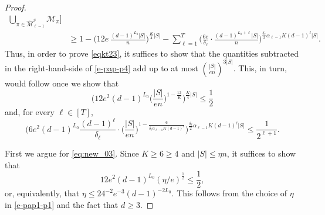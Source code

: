 \documentclass[11pt,leqno]{amsart}
\theoremstyle{remark}
\theoremstyle{plain}
\begin{document}
\begin{proof}
\begin{align}
\bigcup_{\pi\in \widehat{\mathcal{M}}^S_{\ell-1}} \mathcal{M}_{\pi} \bigg] \nonumber \\
& \geqslant 1 -\Big(12e\, \frac{(d-1)^{L_0}|S|}{n} \Big)^{\frac{K}{4} |S|}
- \sum_{\ell=1}^{T}  \Big(\frac{6e}{\delta_\ell} \cdot
\frac{(d-1)^{L_0+\ell}|S|}{n}\Big)^{\frac{\delta_\ell}{2} \alpha_{\ell-1}K (d-1)^{\ell} |S|}. \nonumber
\end{align}
Thus, in order to prove \eqref{eqkt23}, it suffices to show that the quantities subtracted  in the right-hand-side of \eqref{e-pap-p4}
add up to at most $\binom{|S|}{e n}^{3|S|}$. This, in turn, would follow once we show that
\begin{equation}\label{eq:new_03}
\bigg(12 e^2 (d-1)^{L_0} \Big(\frac{|S|}{en}\Big)^{1-\frac{12}{K}} \bigg)^{\frac{K}{4}|S|} \leqslant \frac{1}{2}
\end{equation}
and, for every $\ell\in[T]$,
\begin{equation} \label{e-pap-p5}
\bigg(6e^2(d-1)^{L_0}\frac{(d-1)^{\ell}}{\delta_\ell} \cdot
\Big(\frac{|S|}{en}\Big)^{1-\frac{6}{\delta_\ell\alpha_{\ell-1}K(d-1)^{\ell}}}
\bigg)^{\frac{\delta_\ell}{2} \alpha_{\ell-1}K (d-1)^{\ell} |S|}
\leqslant \frac{1}{2^{\ell+1}}.
\end{equation}

First we argue for \eqref{eq:new_03}. Since $K\geqslant 6\geqslant 4$ and $|S|\leqslant\eta n$, it suffices to show that
\[ 12 e^2 (d-1)^{L_0} (\eta/e)^{\frac{1}{2}}\leqslant\frac{1}{2}, \]
or, equivalently, that $\eta\leqslant 24^{-2}e^{-3}(d-1)^{-2L_0}$.
This follows from the choice of $\eta$ in \eqref{e-pap1-p1} and the fact that $d\geqslant 3$.


\end{proof}
\end{document}
